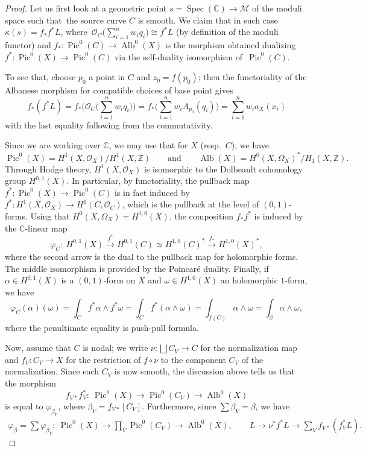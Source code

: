 \documentclass[pdftex]{sigma}
\newcommand{\Pic}{\operatorname{Pic}}
\newcommand{\Alb}{\operatorname{Alb}}
\newcommand{\ZZ}{\mathbb{Z}}
\newcommand{\CC}{\mathbb{C}}
\newcommand{\M}{\mathcal{M}}
\renewcommand{\O}{\mathcal{O}}
\numberwithin{equation}{section}
\theoremstyle{definition}
\begin{document}
\begin{proof}
Let us first look at a geometric point $s=\operatorname{Spec}(\mathbb C)\to\M$ of the moduli space such that~the source curve $C$ is smooth. We claim that in such case
$\kappa(s)=f_*f^*L$,
where~${\O_C \bigl(\sum_{i=1}^n w_i q_i\bigr)\cong f^*L}$ (by definition of the moduli functor) and
$f_*\colon\Pic^0(C)\to\operatorname{Alb}^0(X)$ is the morphism obtained dualizing $f^*\colon\Pic^0(X)\to\Pic^0(C)$ via the self-duality isomorphism of~$\Pic^0(C)$.

To see that, choose $p_0$ a point in $C$ and $z_0=f(p_0)$; then the functoriality of the Albanese morphism for compatible choices of base point gives
\[f_*(f^*L)=f_*\biggl(\O_C\biggl(\sum_{i=1}^n w_i q_i\biggr)\biggr)=f_*\biggl(\sum_{i=1}^n w_i A_{p_0}(q_i)\biggr)= \sum_{i=1}^n w_i a_X(x_i)\]
with the last equality following from the commutativity.

Since we are working over $\mathbb C$, we may use that for $X$ (resp.\ $C$), we have
 \[ \Pic^0(X)=H^1(X,\O_X)/H^1(X,\ZZ) \qquad \text{and}\qquad \Alb(X)=H^0(X,\Omega_X)^*/H_1(X,\ZZ). \]
Through Hodge theory, $H^1(X,\O_X)$ is isomorphic to the Dolbeault cohomology group $H^{0,1}(X)$. In particular, by functoriality, the pullback map $f^*\colon\Pic^0(X)\to\Pic^0(C)$ is in fact induced by~${f^*\colon H^1(X,\O_X)\to H^1(C,\O_C)}$, which is the pullback at the level of $(0,1)$-forms. Using that $H^0(X,\Omega_X)=H^{1,0}(X)$, the composition $f_* f^*$ is induced by the $\CC$-linear map
 \[ \varphi_C \colon\ H^{0,1}(X) \xrightarrow{f^*} H^{0,1}(C)\simeq H^{1,0}(C)^*\xrightarrow{f_*}H^{1,0}(X)^*, \]
where the second arrow is the dual to the pullback map for holomorphic forms. The middle isomorphism is provided by the Poincar\'e duality. Finally, if $\alpha\in H^{0,1}(X)$ is a $(0,1)$-form on $X$ and $\omega\in H^{1,0}(X)$ an holomorphic $1$-form, we have
 \[ \varphi_C(\alpha)(\omega) = \int_C f^*\alpha\wedge f^*\omega = \int_C f^*(\alpha\wedge\omega) = \int_{f(C)}\alpha\wedge\omega= \int_\beta \alpha\wedge\omega, \]
where the penultimate equality is push-pull formula.

Now, assume that $C$ is nodal; we write $\nu\colon\bigsqcup C_V\to C$ for the normalization map and $f_V\colon C_V\to X$ for the restriction of $f\circ\nu$ to the component $C_V$ of the normalization. Since each $C_V$ is now smooth, the discussion above tells us that the morphism
\[
f_{V\ast}f_V^*\colon\ \Pic^0(X)\to\Pic^0(C_V)\to\operatorname{Alb}^0(X)
\]
is equal to $\varphi_{\beta_V}$, where $\beta_V=f_{V\ast}[C_V]$. Furthermore, since $\sum \beta_V=\beta$, we have
\begin{align*}
\varphi_{\beta}=\sum \varphi_{\beta_V}\colon\ \Pic^0(X) \to\prod_V\Pic^0(C_V)\to\operatorname{Alb}^0(X),\qquad
 L \to \nu^*f^*L\to \sum_V f_{V\ast}(f_V^*L).
\end{align*}


\end{proof}
\end{document}
